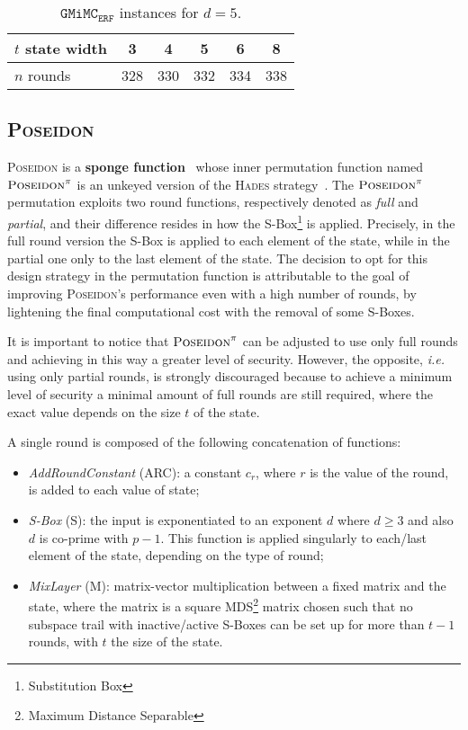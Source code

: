 \documentclass[12pt, a4paper]{report}
\begin{document}
\begin{table}[H]
  \caption{$\texttt{GMiMC}_\texttt{ERF}$ instances for $d = 5$.}\label{tab:gmimcinstances}
  \begin{center}
    \begin{tabular}{|l|c|c|c|c|c|}
      \hline
      $t$ state width & 3 & 4 & 5 & 6 & 8 \\
      \hline
      $n$ rounds & 328 & 330 & 332 & 334 & 338 \\
      \hline
    \end{tabular}
  \end{center}
\end{table}
\subsection{\textsc{Poseidon}}\label{subsec:poseidon}

\textsc{Poseidon} is a \textbf{sponge function}~\cite{sponge} whose inner permutation function named $\textsc{Poseidon}^\pi$ is an unkeyed version of the \textsc{Hades} strategy~\cite{hades}.
The $\textsc{Poseidon}^\pi$ permutation exploits two round functions, respectively denoted as \textit{full} and \textit{partial}, and their difference resides in how the S-Box\footnote{Substitution Box} is applied.
Precisely, in the full round version the S-Box is applied to each element of the state, while in the partial one only to the last element of the state. 
The decision to opt for this design strategy in the permutation function is attributable to the goal of improving \textsc{Poseidon}'s performance even with a high number of rounds, by lightening the final computational cost with the removal of some S-Boxes.
\begin{note}
It is important to notice that $\textsc{Poseidon}^\pi$ can be adjusted to use only full rounds and achieving in this way a greater level of security.
However, the opposite, \textsl{i.e.} using only partial rounds, is strongly discouraged because to achieve a minimum level of security a minimal amount of full rounds are still required, where the exact value depends on the size $t$ of the state.
\end{note}

A single round is composed of the following concatenation of functions:
\begin{itemize}
  \item \textit{AddRoundConstant} (ARC): a constant $c_r$, where $r$ is the value of the round, is added to each value of state;
  \item \textit{S-Box} (S): the input is exponentiated to an exponent $d$ where $d \ge 3$ and also $d$ is co-prime with $p-1$. This function is applied singularly to each/last element of the state, depending on the type of round;
  \item \textit{MixLayer} (M): matrix-vector multiplication between a fixed matrix and the state, where the matrix is a square MDS\footnote{Maximum Distance Separable} matrix chosen such that no subspace trail with inactive/active S-Boxes can be set up for more than $t-1$ rounds, with $t$ the size of the state.
\end{itemize}
\end{document}
